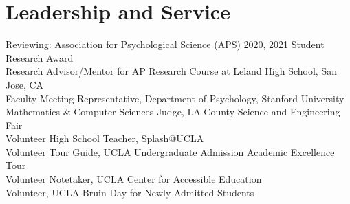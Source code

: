 \section*{Leadership and Service}
Reviewing: Association for Psychological Science (APS) 2020, 2021 Student Research Award\\

Research Advisor/Mentor for AP Research Course at Leland High School, San Jose, CA\\
Faculty Meeting Representative, Department of Psychology, Stanford University\\
Mathematics \& Computer Sciences Judge, LA County Science and Engineering Fair\\
Volunteer High School Teacher, Splash@UCLA\\
Volunteer Tour Guide, UCLA Undergraduate Admission Academic Excellence Tour\\
Volunteer Notetaker, UCLA Center for Accessible Education\\
Volunteer, UCLA Bruin Day for Newly Admitted Students